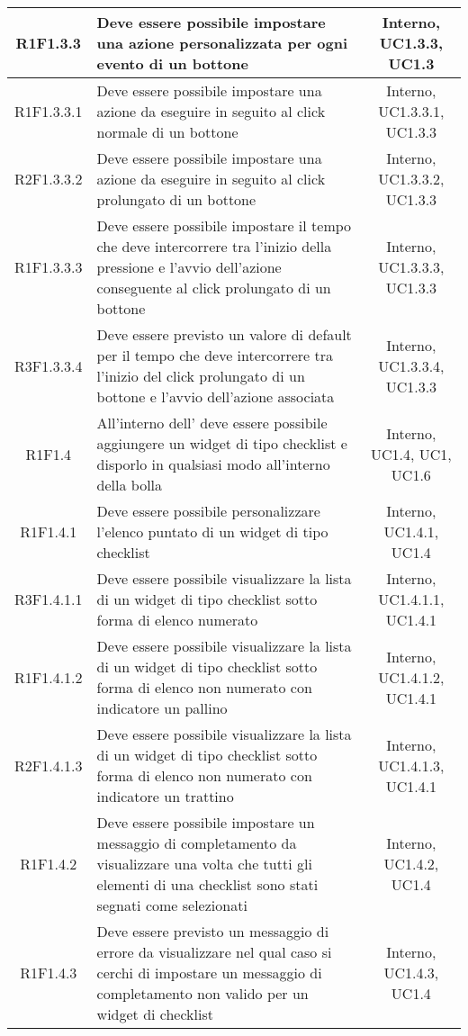 \begin{longtable}{|c|>{\centering}m{7cm}|c|}
		\hline
			R1F1.3.3 & Deve essere possibile impostare una azione personalizzata per ogni evento di un bottone & Interno, UC1.3.3, UC1.3 \\
			\hline
		R1F1.3.3.1 & Deve essere possibile impostare una azione da eseguire in seguito al click normale di un bottone & Interno, UC1.3.3.1, UC1.3.3\\ 
		\hline
		R2F1.3.3.2 & Deve essere possibile impostare una azione da eseguire in seguito al click prolungato di un bottone & Interno, UC1.3.3.2, UC1.3.3\\ 
		\hline
		R1F1.3.3.3 & Deve essere possibile impostare il tempo che deve intercorrere tra l'inizio della pressione e l'avvio dell'azione conseguente al click prolungato di un bottone & Interno, UC1.3.3.3, UC1.3.3\\ 
		\hline
		R3F1.3.3.4 & Deve essere previsto un valore di default per il tempo che deve intercorrere tra l'inizio del click prolungato di un bottone e l'avvio dell'azione associata & Interno, UC1.3.3.4, UC1.3.3\\ 
		\hline
		R1F1.4 & All'interno dell'\termine{SDK} deve essere possibile aggiungere un widget di tipo checklist e disporlo in qualsiasi modo all'interno della bolla & Interno, UC1.4, UC1, UC1.6 \\ 
		\hline
		R1F1.4.1 & Deve essere possibile personalizzare l'elenco puntato di un widget di tipo checklist & Interno, UC1.4.1, UC1.4 \\
		\hline
		R3F1.4.1.1 & Deve essere possibile visualizzare la lista di un widget di tipo checklist sotto forma di elenco numerato & Interno, UC1.4.1.1, UC1.4.1 \\
		\hline
		R1F1.4.1.2 & Deve essere possibile visualizzare la lista di un widget di tipo checklist sotto forma di elenco non numerato con indicatore un pallino & Interno, UC1.4.1.2, UC1.4.1 \\
		\hline
		R2F1.4.1.3 & Deve essere possibile visualizzare la lista di un widget di tipo checklist sotto forma di elenco non numerato con indicatore un trattino & Interno, UC1.4.1.3, UC1.4.1 \\
		\hline
		R1F1.4.2 & Deve essere possibile impostare un messaggio di completamento da visualizzare una volta che tutti gli elementi di una checklist sono stati segnati come selezionati & Interno, UC1.4.2, UC1.4 \\
		\hline
		R1F1.4.3 & Deve essere previsto un messaggio di errore da visualizzare nel qual caso si cerchi di impostare un messaggio di completamento non valido per un widget di checklist & Interno, UC1.4.3, UC1.4 \\

\end{longtable}
